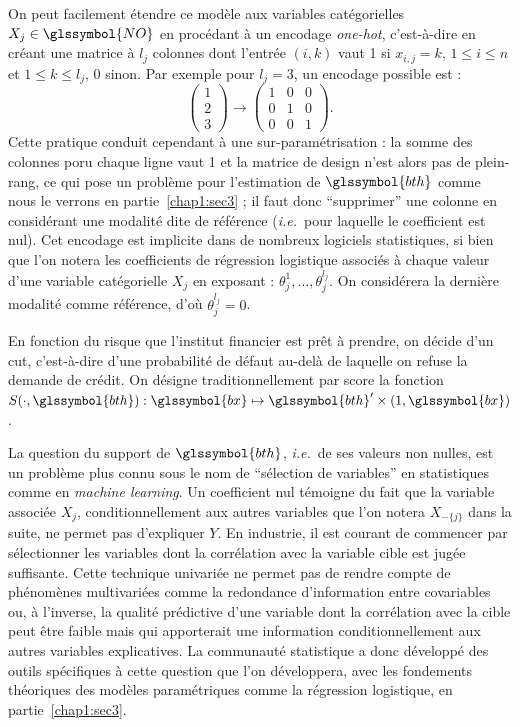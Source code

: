 On peut facilement étendre ce modèle aux variables catégorielles $X_j \in \glssymbol{NO}$ en procédant à un encodage \textit{one-hot}, c'est-à-dire en créant une matrice à $l_j$ colonnes dont l'entrée $(i,k)$ vaut 1 si $x_{i,j} = k$, $1 \leq i \leq n$ et $1 \leq k \leq l_j$, 0 sinon. Par exemple pour $l_j=3$, un encodage possible est :
$$ \left( \begin{array}{c} 1 \\ 2 \\ 3 \end{array} \right) \to \left( \begin{array}{ccc} 1 & 0 & 0 \\ 0 & 1 & 0 \\ 0 & 0 & 1 \end{array} \right).$$
Cette pratique conduit cependant à une sur-paramétrisation : la somme des colonnes poru chaque ligne vaut 1 et la matrice de design n'est alors pas de plein-rang, ce qui pose un problème pour l'estimation de $\glssymbol{bth}$ comme nous le verrons en partie~\ref{chap1:sec3} ; il faut donc ``supprimer'' une colonne en considérant une modalité dite de référence (\textit{i.e.}\ pour laquelle le coefficient est nul). Cet encodage est implicite dans de nombreux logiciels statistiques, si bien que l'on notera les coefficients de régression logistique associés à chaque valeur d'une variable catégorielle $X_j$ en exposant : $\theta_j^{1},\dots,\theta_j^{l_j}$. On considérera la dernière modalité comme référence, d'où $\theta_j^{l_j} = 0$.

En fonction du risque que l'institut financier est prêt à prendre, on décide d'un \gls{cut}, c'est-à-dire d'une probabilité de défaut au-delà de laquelle on refuse la demande de crédit. On désigne traditionnellement par \gls{score} la fonction $S(\cdot,\glssymbol{bth}): \glssymbol{bx} \mapsto \glssymbol{bth}' \times (1,\glssymbol{bx})$.

La question du support  de $\glssymbol{bth}$, \textit{i.e.}\ de ses valeurs non nulles, est un problème plus connu sous le nom de ``sélection de variables'' en statistiques comme en \textit{machine learning}. Un coefficient nul témoigne du fait que la variable associée $X_j$, conditionnellement aux autres variables que l'on notera $X_{-\{j\}}$ dans la suite, ne permet pas d'expliquer $Y$. En industrie, il est courant de commencer par sélectionner les variables dont la corrélation avec la variable cible est jugée suffisante. Cette technique univariée ne permet pas de rendre compte de phénomènes multivariées comme la redondance d'information entre covariables ou, à l'inverse, la qualité prédictive d'une variable dont la corrélation avec la cible peut être faible mais qui apporterait une information conditionnellement aux autres variables explicatives. La communauté statistique a donc développé des outils spécifiques à cette question que l'on développera, avec les fondements théoriques des modèles paramétriques comme la régression logistique, en partie~\ref{chap1:sec3}.

